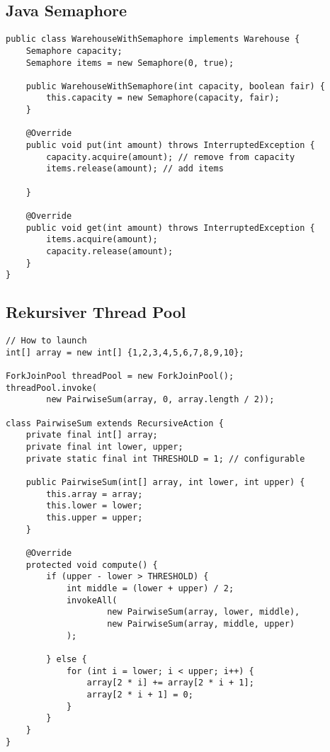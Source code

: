 \subsection{Java Semaphore}

\begin{lstlisting}[style=csharp]
public class WarehouseWithSemaphore implements Warehouse {
	Semaphore capacity;
	Semaphore items = new Semaphore(0, true);

	public WarehouseWithSemaphore(int capacity, boolean fair) {
		this.capacity = new Semaphore(capacity, fair);
	}

	@Override
	public void put(int amount) throws InterruptedException {
		capacity.acquire(amount); // remove from capacity
		items.release(amount); // add items

	}

	@Override
	public void get(int amount) throws InterruptedException {
		items.acquire(amount);
		capacity.release(amount);
	}
}
\end{lstlisting}

\subsection{Rekursiver Thread Pool}

\begin{lstlisting}[style=csharp]
// How to launch
int[] array = new int[] {1,2,3,4,5,6,7,8,9,10};

ForkJoinPool threadPool = new ForkJoinPool();
threadPool.invoke(
		new PairwiseSum(array, 0, array.length / 2));

class PairwiseSum extends RecursiveAction {
    private final int[] array;
    private final int lower, upper;
    private static final int THRESHOLD = 1; // configurable

    public PairwiseSum(int[] array, int lower, int upper) { 
    	this.array = array;
        this.lower = lower;
        this.upper = upper;
    }

    @Override
    protected void compute() {
        if (upper - lower > THRESHOLD) {
            int middle = (lower + upper) / 2;
            invokeAll(
                    new PairwiseSum(array, lower, middle),
                    new PairwiseSum(array, middle, upper)
            );

        } else {
            for (int i = lower; i < upper; i++) {
                array[2 * i] += array[2 * i + 1]; 
                array[2 * i + 1] = 0;
            }
        }
    }
}
\end{lstlisting}

